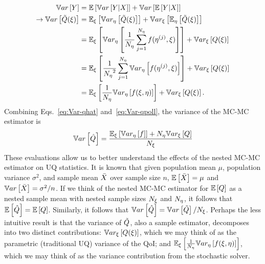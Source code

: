 \begin{equation}\label{eq:Var-qpoll}
    \begin{split}
        \Var{Y} &= \EE{\Var{Y | X}} + \Var{\EE{Y | X}} \\
        \rightarrow \Var{\Qpoll(\xi)} &= \EExi{\Veta{\Qpoll(\xi)}} + \Vxi{\EEeta{\Qpoll(\xi)}} \\
        &= \EExi{\Veta{\frac{1}{\Neta}\sumeta f(\etaj,\xi)}} + \Vxi{Q(\xi)} \\
        &= \EExi{\frac{1}{\Neta^2} \sumeta \Veta{f(\etaj,\xi)}} + \Vxi{Q(\xi)} \\
        &= \EExi{\frac{1}{\Neta} \Veta{\f}} + \Vxi{Q(\xi)} .
    \end{split}
\end{equation}
Combining Eqs.~\eqref{eq:Var-qhat} and~\eqref{eq:Var-qpoll}, the variance of the MC-MC estimator is
\begin{equation}\label{eq:Var-qhat-final}
    \Var{\Qhat} = \frac{\EExi{\Veta{f}} + \Neta \Vxi{Q}}{\Nxi}
\end{equation}
These evaluations allow us to better understand the effects of the nested MC-MC estimator on UQ statistics. It is known that given population mean $\mu$, population variance $\sigma^2$, and sample mean $\Bar{X}$ over sample size $n$, $\EE{\Bar{X}} = \mu$ and $\Var{\Bar{X}} = \sigma^2/n$. If we think of the nested MC-MC estimator for $\EE{Q}$ as a nested sample mean with nested sample sizes $\Nxi$ and $\Neta$, it follows that $\EE{\Qhat}=\EE{Q}$. Similarly, it follows that $\Var{\Qhat} = \Var{\Qpoll}/\Nxi$. Perhaps the less intuitive result is that the variance of $\Qpoll$, also a sample estimator, decomposes into two distinct contributions: $\Vxi{Q(\xi)}$, which we may think of as the parametric (traditional UQ) variance of the QoI; and $\EExi{\frac{1}{\Neta} \Veta{\f}}$, which we may think of as the variance contribution from the stochastic solver.


